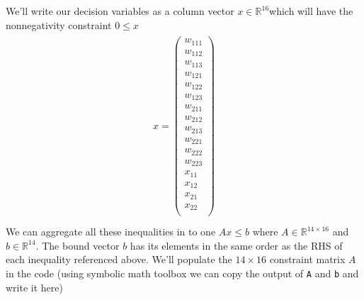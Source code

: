 \documentclass{assignment}
\def\code#1{\texttt{#1}}
\begin{document}
We'll write our decision variables as a column vector $x\in \mathbb{R}^{16}$which will have the nonnegativity constraint $0\leq x $  
\begin{gather*}
\begin{aligned}
    x = 
    \begin{pmatrix}
        w_{111} \\
        w_{112} \\
        w_{113} \\
        w_{121} \\
        w_{122} \\
        w_{123} \\
        w_{211} \\
        w_{212} \\
        w_{213} \\
        w_{221} \\
        w_{222} \\
        w_{223} \\
        x_{11} \\
        x_{12} \\
        x_{21} \\
        x_{22} \\
\end{pmatrix}
\end{aligned} \\
\end{gather*}
We can aggregate all these inequalities in to one $Ax \leq b$ where $A\in \mathbb{R}^{14\times 16}$ and $b\in \mathbb{R}^{14}$. The bound vector $b$ has its elements in the same order as the RHS of each inequality referenced above.
We'll populate the $14 \times 16$ constraint matrix $A$ in the code (using symbolic math toolbox we can copy the output of \code{A} and \code{b} and write it here)
\end{document}
